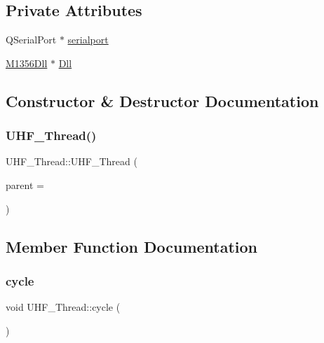 \subsection*{Private Attributes}
\begin{DoxyCompactItemize}
\item 
Q\+Serial\+Port $\ast$ \mbox{\hyperlink{class_u_h_f___thread_a20904e9764b311fdb015c3fd6cbec497}{serialport}}
\item 
\mbox{\hyperlink{class_m1356_dll}{M1356\+Dll}} $\ast$ \mbox{\hyperlink{class_u_h_f___thread_a64b7885c54cd1b820beb220461e9d04a}{Dll}}
\end{DoxyCompactItemize}


\subsection{Constructor \& Destructor Documentation}
\mbox{\label{class_u_h_f___thread_a4e345d08f3f78642458925017371cac2}} 
\subsubsection{\texorpdfstring{UHF\_Thread()}{UHF\_Thread()}}
{\footnotesize\ttfamily U\+H\+F\+\_\+\+Thread\+::\+U\+H\+F\+\_\+\+Thread (\begin{DoxyParamCaption}\item[{Q\+Object $\ast$}]{parent = {} }\end{DoxyParamCaption})\hspace{0.3cm}{\ttfamily [explicit]}}



\subsection{Member Function Documentation}
\mbox{\label{class_u_h_f___thread_a232f1c855e0b835beebcdb4a6b6a4484}} 
\subsubsection{\texorpdfstring{cycle}{cycle}}
{\footnotesize\ttfamily void U\+H\+F\+\_\+\+Thread\+::cycle (\begin{DoxyParamCaption}{ }\end{DoxyParamCaption})\hspace{0.3cm}{\ttfamily [signal]}}

